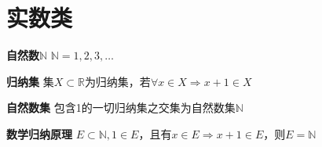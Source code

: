 \documentclass[11pt]{article}
\begin{document}
\section{实数类}
\textbf{自然数$\mathbb{N}$}\newline
$\mathbb{N}={1,2,3,\dots}$\newline

\textbf{归纳集} \newline
集$X\subset\mathbb{R}$为归纳集，若$\forall x \in X \Rightarrow x+1 \in X$ \newline

\textbf{自然数集} \newline
包含1的一切归纳集之交集为自然数集$\mathbb{N}$ \newline

\textbf{数学归纳原理} \newline
$E \subset \mathbb{N}, 1 \in E$，且有$x \in E \Rightarrow x+1 \in E$，则$E=\mathbb{N}$ \newline
\end{document}
